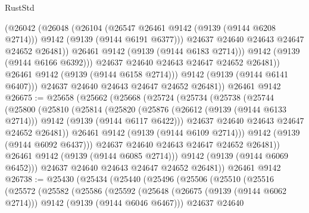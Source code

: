 \begin{lexlean}{RustStd}
\begin{coremodule}
                    (@26042
                      (@26048
                        (@26104
                          (@26547 @26461 @9142 (@9139 (@9144 @6208 @2714)))
                          @9142
                          (@9139 (@9144 @6191 @6377)))
                        @24637
                        @24640
                        @24643
                        @24647
                        @24652
                        @26481))
                    @26461
                    @9142
                    (@9139 (@9144 @6183 @2714)))
                  @9142
                  (@9139 (@9144 @6166 @6392)))
                @24637
                @24640
                @24643
                @24647
                @24652
                @26481))
            @26461
            @9142
            (@9139 (@9144 @6158 @2714)))
          @9142
          (@9139 (@9144 @6141 @6407)))
        @24637
        @24640
        @24643
        @24647
        @24652
        @26481))
    @26461
    @9142
@26675 := @25658
    (@25662
      (@25668
        (@25724
          (@25734
            (@25738
              (@25744
                (@25800
                  (@25810
                    (@25814
                      (@25820
                        (@25876
                          (@26612 (@9139 (@9144 @6133 @2714)))
                          @9142
                          (@9139 (@9144 @6117 @6422)))
                        @24637
                        @24640
                        @24643
                        @24647
                        @24652
                        @26481))
                    @26461
                    @9142
                    (@9139 (@9144 @6109 @2714)))
                  @9142
                  (@9139 (@9144 @6092 @6437)))
                @24637
                @24640
                @24643
                @24647
                @24652
                @26481))
            @26461
            @9142
            (@9139 (@9144 @6085 @2714)))
          @9142
          (@9139 (@9144 @6069 @6452)))
        @24637
        @24640
        @24643
        @24647
        @24652
        @26481))
    @26461
    @9142
@26738 := @25430
    (@25434
      (@25440
        (@25496
          (@25506
            (@25510
              (@25516
                (@25572
                  (@25582
                    (@25586
                      (@25592
                        (@25648
                          (@26675 (@9139 (@9144 @6062 @2714)))
                          @9142
                          (@9139 (@9144 @6046 @6467)))
                        @24637
                        @24640

\end{coremodule}
\end{lexlean}
